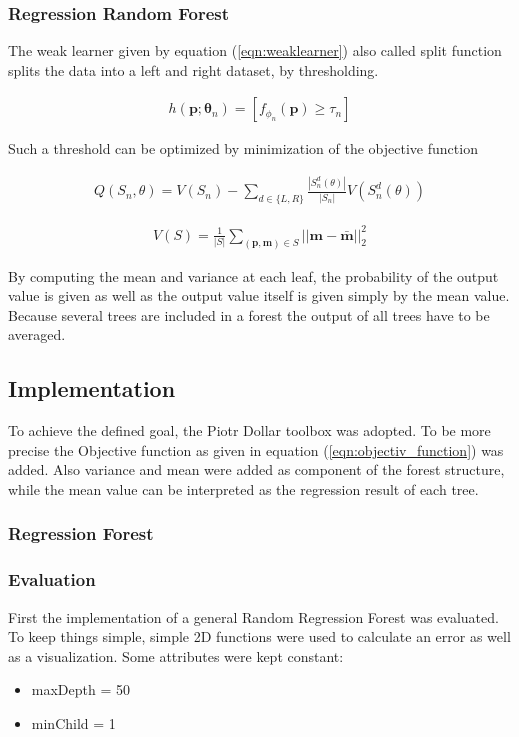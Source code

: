 \subsubsection{Regression Random Forest}
\label{rrf_intro}
The weak learner given by equation (\ref{eqn:weaklearner}) also called split function splits the data into a left and right dataset, by thresholding.

\begin{eqnarray}\label{eqn:weaklearner}
  h(\mathbf{p};\mathbf{\theta}_n) = [ f_{\phi_n}(\mathbf{p}) \geq \tau_n ]
\end{eqnarray}

Such a threshold can be optimized by minimization of the objective function

\begin{eqnarray} \label{eqn:objectiv_function}
  Q(S_n,\theta) = V(S_n) - \sum_{d\in\{L,R\}}{\frac{|S_n^d(\theta)|}{|S_n|}V(S_n^d(\theta))}
\end{eqnarray}

\begin{eqnarray}
  V(S) = \frac{1}{|S|} \sum_{(\mathbf{p},\mathbf{m}) \in S}{||\mathbf{m} - \mathbf{\bar m}||_2^2}
\end{eqnarray}

By computing the mean and variance at each leaf, the probability of the output value is given as well as the output value itself is given simply by the mean value.
Because several trees are included in a forest the output of all trees have to be averaged.

\subsection{Implementation} %
\label{sub:implementation}
To achieve the defined goal, the Piotr Dollar toolbox \cite{piotr} was adopted. To be more precise the Objective function as given in equation (\ref{eqn:objectiv_function}) was added. Also variance and mean were added as component of the forest structure, while the mean value can be interpreted as the regression result of each tree.

\subsubsection*{Regression Forest} %
\label{ssub:regression_forest}


\subsubsection{Evaluation} %
\label{ssub:camera_relocalization}
First the implementation of a general Random Regression Forest was evaluated. To keep things simple, simple 2D functions were used to calculate an error as well as a visualization.
Some attributes were kept constant:
\begin{itemize}
	\item maxDepth = 50
  \item minChild = 1
\end{itemize}

